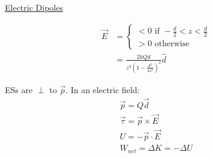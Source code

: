 \documentclass[8pt]{minimal}
\begin{document}
\pagebreak
\underline{Electric Dipoles}

\begin{align*}
    \vec{E} &= \left\{ \begin{matrix}
        < 0 \text{ if } -\frac{d}{2} < z < \frac{d}{2}\\
        > 0 \text{ otherwise}
    \end{matrix} \right.\\
        &=  \frac{2kQd}{z^3\left(1 - \frac{d^2}{4z^2}\right)^2}\hat{d}
\end{align*}

ESs are $\perp$ to $\vec{p}$.
In an electric field:
\begin{gather*}
    \vec{p} = Q\vec{d}\\
    \vec{\tau} = \vec{p} \times \vec{E}\\
    U = -\vec{p} \cdot \vec{E}\\
    W_{net} = \Delta K = -\Delta U
\end{gather*}
\end{document}
